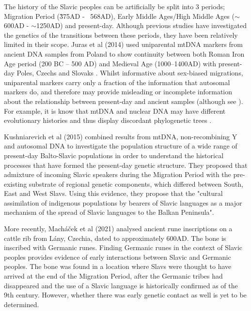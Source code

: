 The history of the Slavic peoples can be artificially be split into 3 periods; Migration Period (\~375AD - ~568AD), Early Middle Ages/High Middle Ages ($\sim$\texttildelow 600AD - $\sim$\texttildelow 1250AD) and present-day. Although previous studies have investigated the genetics of the transitions between these periods, they have been relatively limited in their scope. Juras et al (2014) used uniparental mtDNA markers from ancient DNA samples from Poland to show continuity between both Roman Iron Age period (200 BC – 500 AD) and Medieval Age (1000–1400AD) with present-day Poles, Czechs and Slovaks \cite{Juras2014}. Whilst informative about sex-biased migrations, uniparental markers carry only a fraction of the information that autosomal markers do, and therefore may provide misleading or incomplete information about the relationship between present-day and ancient samples \cite{Shaw16122} (although see \cite{10.1080/10635150500234674}). For example, it is know that mtDNA and nuclear DNA may have different evolutionary histories and thus display discordant phylogenetic trees \cite{posth2017deeply}. 

Kushniarevich et al (2015) \cite{Kushniarevich23015} combined results from mtDNA, non-recombining Y and autosomal DNA to investigate the population structure of a wide range of present-day Balto-Slavic populations in order to understand the historical processes that have formed the present-day genetic structure. They proposed that admixture of incoming Slavic speakers during the Migration Period with the pre-existing substrate of regional genetic components, which differed between South, East and West Slavs. Using this evidence, they propose that the "cultural assimilation of indigenous populations by bearers of Slavic languages as a major mechanism of the spread of Slavic languages to the Balkan Peninsula".

More recently, Macháček et al (2021) \cite{MACHACEK2021105333} analysed ancient rune inscriptions on a cattle rib from Lány, Czechia, dated to approximately 600AD. The bone is inscribed with Germanic runes. Finding Germanic runes in the context of Slavic peoples provides evidence of early interactions between Slavic and Germanic peoples. The bone was found in a location where Slavs were thought to have arrived at the end of the Migration Period, after the Germanic tribes had disappeared and the use of a Slavic language is historically confirmed as of the 9th century. However, whether there was early genetic contact as well is yet to be determined. 

